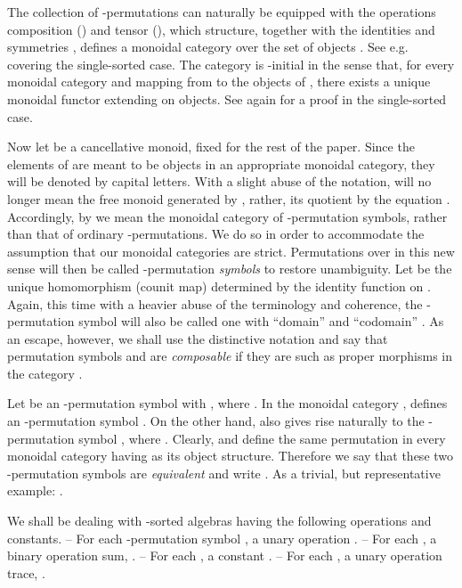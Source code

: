\documentclass{eptcs}
\begin{document}
The collection of -permutations can naturally be equipped with the operations
composition () and tensor (), which structure, together with the 
identities  and symmetries , defines a monoidal 
category  over the set of
objects . See e.g.\ \cite [Definition~1]{acta} covering the single-sorted
case. The category  is -initial in the sense that, for every monoidal category
 and mapping  from  to the objects of , there exists a unique monoidal
functor  extending  on objects. See again \cite
[Corollary 1]{acta}  for a proof in the single-sorted case. 

Now let  be a cancellative monoid, fixed for the rest of the paper.
Since the elements of  are meant to be objects in an appropriate monoidal
category, they will be denoted by capital letters. With a slight abuse of the
notation,  will no longer mean the free monoid generated by , rather, its
quotient by the equation . Accordingly, by  we mean the monoidal
category of -permutation symbols, rather than that of ordinary -permutations.
We do so in order to accommodate the assumption that our monoidal categories
are strict. Permutations over  in this new sense will then be called 
-permutation {\em symbols\/} to restore unambiguity. Let 
be the unique homomorphism (counit map) determined by the identity function on .
Again, this time with a heavier abuse of the terminology and coherence, the -permutation
symbol  will also be called one with ``domain'' 
and ``codomain'' . As an escape, however, we shall use the distinctive
notation  and say that permutation symbols 
and  are {\em composable\/} if they are such as proper morphisms
in the category . 

Let  be an -permutation symbol with , where . In the monoidal category
,  defines an -permutation symbol
.
On the other hand,  also gives rise naturally to the -permutation
symbol , where . Clearly, 
 and  define the same permutation
 in every monoidal category
having  as its object structure. Therefore we say that these
two -permutation symbols 
are {\em equivalent\/} and write  . As a trivial, but representative example:
.

 We shall be dealing with -sorted algebras  having
the following operations and constants.
\vsp \newline 
  -- For each -permutation symbol , a unary operation 
    .
\newline
  -- For each , a binary operation sum, .
\newline
  -- For each , a constant .
\newline
  -- For each , a unary operation trace, .
\vsp
\end{document}
